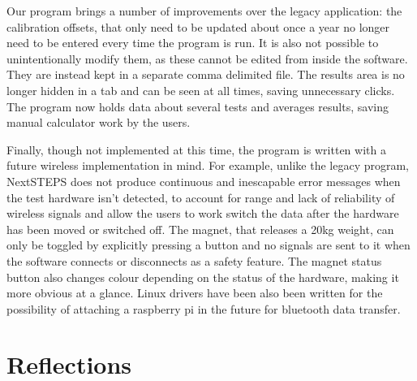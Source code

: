 \documentclass{l3proj}
\begin{document}
Our program brings a number of improvements over the legacy application: the calibration offsets, that only need to be updated about once a year no longer need to be entered every time the program is run. It is also not possible to unintentionally modify them, as these cannot be edited from inside the software. They are instead kept in a separate comma delimited file. The results area is no longer hidden in a tab and can be seen at all times, saving unnecessary clicks. The program now holds data about several tests and averages results, saving manual calculator work by the users.

Finally, though not implemented at this time, the program is written with a future wireless implementation in mind. For example, unlike the legacy program, NextSTEPS does not produce continuous and inescapable error messages when the test hardware isn't detected, to account for range and lack of reliability of wireless signals and allow the users to work switch the data after the hardware has been moved or switched off. The magnet, that releases a 20kg weight, can only be toggled by explicitly pressing a button and no signals are sent to it when the software connects or disconnects as a safety feature. The magnet status button also changes colour depending on the status of the hardware, making it more obvious at a glance. Linux drivers have been also been written for the possibility of attaching a raspberry pi in the future for bluetooth data transfer. 



\section{Reflections}
\end{document}
